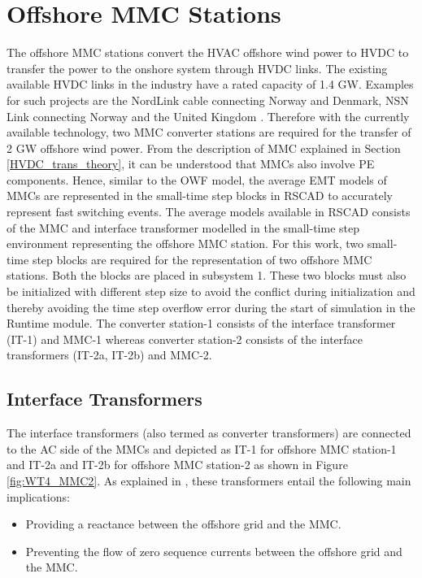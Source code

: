 \section{Offshore MMC Stations}
The offshore \gls{MMC} stations convert the \gls{HVAC} offshore wind power to \gls{HVDC} to transfer the power to the onshore system through \gls{HVDC} links.  %
The existing available \gls{HVDC} links in the industry have a rated capacity of 1.4 GW. Examples for such projects are the NordLink cable connecting Norway and Denmark, NSN Link connecting Norway and the United Kingdom \cite{ryndzionek_evolution_2020}. Therefore with the currently available technology, two \gls{MMC} converter stations are required for the transfer of 2 GW offshore wind power. From the description of \gls{MMC} explained in Section \ref{HVDC_trans_theory}, it can be understood that \gls{MMC}s also involve \gls{PE} components. Hence, similar to the \gls{OWF} model, the average \gls{EMT} models of \gls{MMC}s are represented in the small-time step blocks in RSCAD to accurately represent fast switching events. The average models available in RSCAD consists of the \gls{MMC} and interface transformer modelled in the small-time step environment representing the offshore \gls{MMC} station. For this work, two small-time step blocks are required for the representation of two offshore \gls{MMC} stations. Both the blocks are placed in subsystem 1. These two blocks must also be initialized with different step size to avoid the conflict during initialization and thereby avoiding the time step overflow error during the start of simulation in the Runtime module. The converter station-1 consists of the interface transformer (IT-1) and \gls{MMC}-1 whereas converter station-2 consists of the interface transformers (IT-2a, IT-2b) and \gls{MMC}-2. 

\subsection{Interface Transformers}
The interface transformers (also termed as converter transformers) are connected to the \gls{AC} side of the \gls{MMC}s and depicted as IT-1 for offshore \gls{MMC} station-1 and IT-2a and IT-2b for offshore \gls{MMC} station-2 as shown in Figure \ref{fig:WT4_MMC2}. As explained in \cite{cigre2005b4}, these transformers entail the following main implications:
\begin{itemize}
    \item Providing a reactance between the offshore grid and the \gls{MMC}.
    \item Preventing the flow of zero sequence currents between the offshore grid and the \gls{MMC}.
\end{itemize} 

